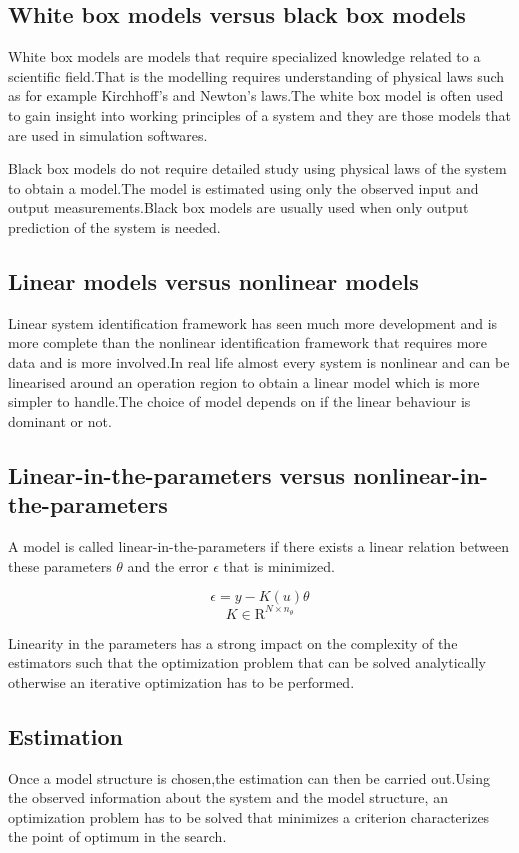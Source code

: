 \documentclass[a4paper,12pt]{report}
\numberwithin{equation}{section}
\begin{document}
\subsection*{ White box models versus black box models }
White box models are models that require specialized knowledge related to a scientific field.That is the modelling requires understanding of physical laws such as for example Kirchhoff’s and Newton’s laws.The white box model is often used to gain insight into working principles of a system and they are those models that are used in simulation softwares.

Black box models do not require detailed study using physical laws of the system to obtain a model.The model is estimated  using only the observed input and output measurements.Black box models are usually used when only output prediction of the system is needed. 

\subsection*{ Linear models versus nonlinear models }
Linear system identification framework has seen much more development and is more complete than the nonlinear identification framework that  requires more data and is more involved.In real life almost every system is nonlinear and  can be linearised around an operation region to obtain a linear model which is more simpler to handle.The choice of model depends on if the linear behaviour is dominant or not.

\subsection*{ Linear-in-the-parameters versus nonlinear-in-the-parameters }
A model is called linear-in-the-parameters if there exists a linear relation between these parameters $\theta$ and the error $\epsilon$ that is minimized.

\[\epsilon=y-K(u) \theta\]
\[K \in \mathrm{R}^{N \times n_{\theta}}\]

Linearity in the parameters has a strong impact on the complexity of the estimators such that the optimization problem that can be solved analytically  otherwise an iterative optimization has to be performed.

\subsection{ Estimation}
Once a model structure is chosen,the estimation can then be carried out.Using the observed information about the system and the model structure, an optimization problem has to be solved that minimizes a criterion characterizes the point of optimum in the search.
\end{document}
